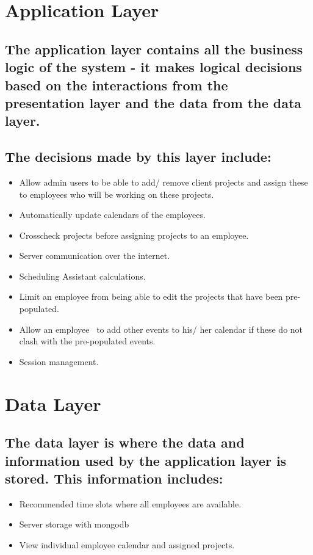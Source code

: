 \documentclass{article}
\begin{document}
  \section{Application Layer}
    \subsection{The application layer contains all the business logic of the system - it makes logical decisions based on the interactions from the presentation layer and the data from the data layer.}
    \subsection{The decisions made by this layer include:}
  \begin{itemize}
    \item Allow admin users to be able to add/ remove client projects and assign these to employees who will be working on these projects.
    \item Automatically update calendars of the employees.
    \item Crosscheck projects before assigning projects to an employee.
    \item Server communication over the internet.
    \item Scheduling Assistant calculations. 
    \item Limit an employee from being able to edit the projects that have been pre-populated.
    \item Allow an employee  to add other events to his/ her calendar if these do not clash with the pre-populated events.
    \item Session management.
  \end{itemize}
  
  \section{Data Layer}
    \subsection{The data layer is where the data and information used by the application layer is stored. This information includes:}
  \begin{itemize}
    \item Recommended time slots where all employees are available. 
    \item Server storage with mongodb
    \item View individual employee calendar and assigned projects. 
  \end{itemize}
  
\end{document}
